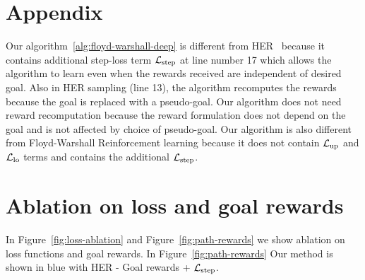 \section{Appendix}

Our algorithm~\ref{alg:floyd-warshall-deep} is different from
HER~\cite{andrychowicz2016learning} because it contains additional step-loss
term $\mathcal{L}_{\text{step}}$ at line number 17 which allows the algorithm to learn even when
the rewards received are independent of desired goal. Also in HER sampling (line
13), the algorithm recomputes the rewards because the goal is replaced with a
pseudo-goal. Our algorithm does not need reward recomputation because the reward
formulation does not depend on the goal and is not affected by choice of
pseudo-goal.
Our algorithm is also different from Floyd-Warshall Reinforcement learning
because it does not contain $\mathcal{L}_{\text{up}}$ and $\mathcal{L}_{\text{lo}}$ terms and contains the
additional $\mathcal{L}_{\text{step}}$.



\section{Ablation on loss and goal rewards}

In Figure~\ref{fig:loss-ablation} and Figure~\ref{fig:path-rewards} we show
ablation on loss functions and goal rewards. In Figure~\ref{fig:path-rewards}
Our method is shown in blue with HER - Goal rewards + $\mathcal{L}_{\text{step}}$.

\begin{figure*}
\hfill

\end{figure*}